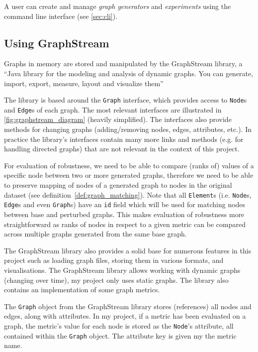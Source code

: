 A user can create and manage \textsl{graph generators} and \textsl{experiments} using the command line interface (see \autoref{sec:cli}).

\subsection{Using GraphStream}

Graphs in memory are stored and manipulated by the GraphStream library\cite{DutotGraphStreamToolBridging2007}, a \enquote{Java library for the modeling and analysis of dynamic graphs. You can generate, import, export, measure, layout and visualize them}



The library is based around the \texttt{Graph} interface, which provides access to \texttt{Node}s and \texttt{Edge}s of each graph.
The most relevant interfaces are illustrated in \autoref{fig:graphstream_diagram} (heavily simplified).
The interfaces also provide methods for changing graphs (adding/removing nodes, edges, attributes, etc.).
In practice the library's interfaces contain many more links and methods (e.g. for handling directed graphs) that are not relevant in the context of this project.

For evaluation of robustness, we need to be able to compare (ranks of) values of a specific node between two or more generated graphs, therefore we need to be able to preserve mapping of nodes of a generated graph to nodes in the original dataset (see definition~\ref{def:graph_matching}).
Note that all \texttt{Element}s (i.e. \texttt{Node}s, \texttt{Edge}s and even \texttt{Graph}s) have an \texttt{id} field which will be used for matching nodes between base and perturbed graphs.
This makes evaluation of robustness more straightforward as ranks of nodes in respect to a given metric can be compared across multiple graphs generated from the same base graph.

The GraphStream library also provides a solid base for numerous features in this project such as loading graph files, storing them in various formats, and visualisations.
The GraphStream library allows working with dynamic graphs (changing over time), my project only uses static graphs.
The library also contains an implementation of some graph metrics.

\parspace

The \texttt{Graph} object from the GraphStream library stores (references) all nodes and edges, along with attributes.
In my project, if a metric has been evaluated on a graph, the metric's value for each node is stored as the \texttt{Node}'s attribute, all contained within the \texttt{Graph} object.
The attribute key is given my the metric name.

